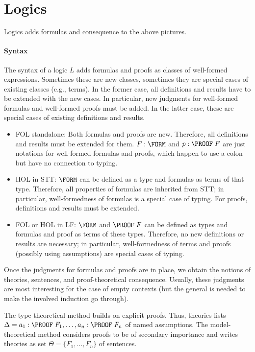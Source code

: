 \section{Logics}

Logics adds formulas and consequence to the above pictures.

\paragraph{Syntax}
The syntax of a logic $L$ adds formulas and proofs as classes of well-formed expressions. Sometimes these are new classes, sometimes they are special cases of existing classes (e.g., terms). In the former case, all definitions and results have to be extended with the new cases. In particular, new judgments for well-formed formulas and well-formed proofs must be added. In the latter case, these are special cases of existing definitions and results.
\begin{itemize}
	\item FOL standalone: Both formulas and proofs are new. Therefore, all definitions and results must be extended for them. $F:\FORM$ and $p:\PROOF\;F$ are just notations for well-formed formulas and proofs, which happen to use a colon but have no connection to typing.
	\item HOL in STT: $\FORM$ can be defined as a type and formulas as terms of that type. Therefore, all properties of formulas are inherited from STT; in particular, well-formedness of formulas is a special case of typing. For proofs, definitions and results must be extended.
	\item FOL or HOL in LF: $\FORM$ and $\PROOF\;F$ can be defined as types and formulas and proof as terms of these types. Therefore, no new definitions or results are necessary; in particular, well-formedness of terms and proofs (possibly using assumptions) are special cases of typing.
\end{itemize}

Once the judgments for formulas and proofs are in place, we obtain the notions of theories, sentences, and proof-theoretical consequence. Usually, these judgments are most interesting for the case of empty contexts (but the general is needed to make the involved induction go through).

The type-theoretical method builds on explicit proofs. Thus, theories lists $\Delta=a_1:\PROOF\;F_1,\ldots,a_n:\PROOF\;F_n$ of named assumptions. The model-theoretical method considers proofs to be of secondary importance and writes theories as set $\Theta=\{F_1,\ldots,F_n\}$ of sentences.

